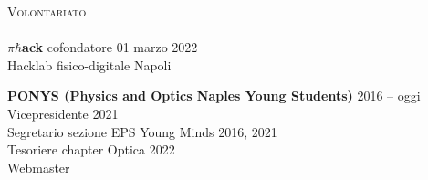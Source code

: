 \documentclass[a4paper]{article}
\newcommand{\lineunder} {
  \vspace*{-8pt} \\
  \hspace*{-18pt} \hrulefill \\
}
\newcommand{\header} [1] {
  {\hspace*{-18pt}\vspace*{6pt} \textsc{#1}}
  \vspace*{-6pt} \lineunder
}
\begin{document}
\header{Volontariato}

\(\pi\hbar\)\textbf{ack} cofondatore \hfill 01 marzo 2022 \\
Hacklab fisico-digitale \hfill Napoli \\
\vspace{2mm}

\textbf{PONYS (Physics and Optics Naples Young Students)} \hfill 2016 -- oggi\\
\vspace{2mm}
Vicepresidente \hfill 2021\\
Segretario sezione EPS Young Minds \hfill 2016, 2021\\
Tesoriere chapter Optica \hfill 2022\\
Webmaster\\
\vspace{2mm}
\end{document}
